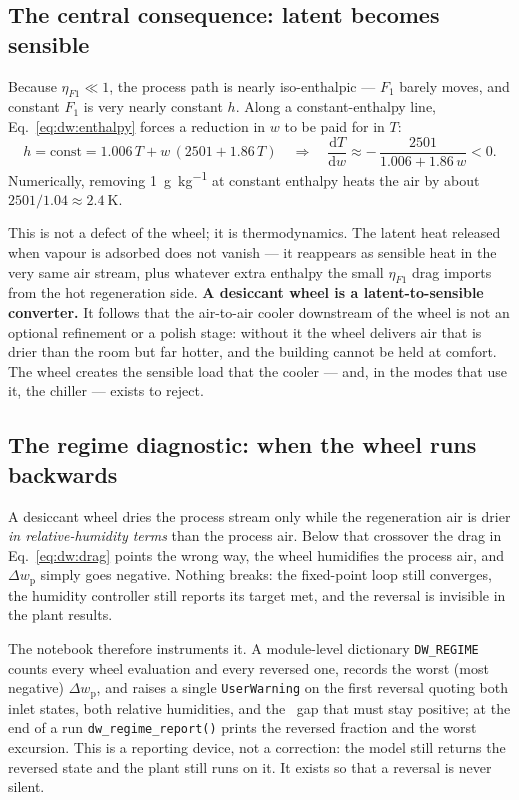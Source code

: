 \subsection{The central consequence: latent becomes sensible}
\label{sec:dw:latent}

Because $\eta_{F1}\ll 1$, the process path is nearly iso-enthalpic --- $F_1$
barely moves, and constant $F_1$ is very nearly constant $h$. Along a
constant-enthalpy line, Eq.~\eqref{eq:dw:enthalpy} forces a reduction in $w$
to be paid for in $T$:
\begin{equation}
h=\text{const}=1.006\,T+w\,(2501+1.86\,T)
\quad\Longrightarrow\quad
\frac{\mathrm{d}T}{\mathrm{d}w}
\approx -\,\frac{2501}{1.006+1.86\,w} < 0 .
\label{eq:dw:latent2sensible}
\end{equation}
Numerically, removing \SI{1}{\gram\per\kilogram} at constant enthalpy heats
the air by about $2501/1.04 \approx \SI{2.4}{\kelvin}$.

This is not a defect of the wheel; it is thermodynamics. The latent heat
released when vapour is adsorbed does not vanish --- it reappears as sensible
heat in the very same air stream, plus whatever extra enthalpy the small
$\eta_{F1}$ drag imports from the hot regeneration side. \textbf{A desiccant
wheel is a latent-to-sensible converter.} It follows that the air-to-air
cooler downstream of the wheel is not an optional refinement or a
polish stage: without it the wheel delivers air that is drier than the room
but far hotter, and the building cannot be held at comfort. The wheel creates
the sensible load that the cooler --- and, in the modes that use it, the
chiller --- exists to reject.

\subsection{The regime diagnostic: when the wheel runs backwards}
\label{sec:dw:regime}

A desiccant wheel dries the process stream only while the regeneration air is
drier \emph{in relative-humidity terms} than the process air. Below that
crossover the drag in Eq.~\eqref{eq:dw:drag} points the wrong way, the wheel
humidifies the process air, and $\Delta w_{\mathrm{p}}$ simply goes negative.
Nothing breaks: the fixed-point loop still converges, the humidity controller
still reports its target met, and the reversal is invisible in the plant
results.

The notebook therefore instruments it. A module-level dictionary
\texttt{DW\_REGIME} counts every wheel evaluation and every reversed one,
records the worst (most negative) $\Delta w_{\mathrm{p}}$, and raises a single
\texttt{UserWarning} on the first reversal quoting both inlet states, both
relative humidities, and the \RH\ gap that must stay positive; at the end of a
run \texttt{dw\_regime\_report()} prints the reversed fraction and the worst
excursion. This is a reporting device, not a correction: the model still
returns the reversed state and the plant still runs on it. It exists so that a
reversal is never silent.

